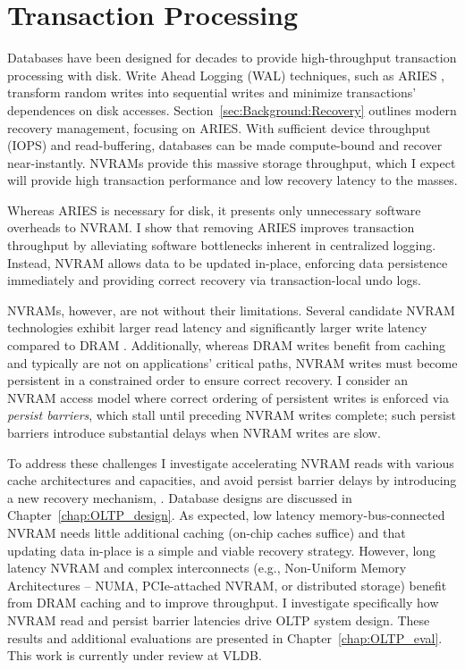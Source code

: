 \section{Transaction Processing}
\label{sec:Intro:OLTP}

Databases have been designed for decades to provide high-throughput transaction processing with disk.
Write Ahead Logging (WAL) techniques, such as ARIES \cite{MohanHaderle92}, transform random writes into sequential writes and minimize transactions' dependences on disk accesses.
Section~\ref{sec:Background:Recovery} outlines modern recovery management, focusing on ARIES.
With sufficient device throughput (IOPS) and read-buffering, databases can be made compute-bound and recover near-instantly.
NVRAMs provide this massive storage throughput, which I expect will provide high transaction performance and low recovery latency to the masses.

Whereas ARIES is necessary for disk, it presents only unnecessary software overheads to NVRAM.
I show that removing ARIES improves transaction throughput by alleviating software bottlenecks inherent in centralized logging.
Instead, NVRAM allows data to be updated in-place, enforcing data persistence immediately and providing correct recovery via transaction-local undo logs.

NVRAMs, however, are not without their limitations.
Se\-veral candidate NVRAM technologies exhibit larger read latency and significantly larger write latency compared to DRAM \cite{BurrKurdi08}.
Additionally, whereas DRAM writes benefit from caching and typically are not on applications' critical paths, NVRAM writes must become persistent in a constrained order to ensure correct recovery.
I consider an NVRAM access model where correct ordering of persistent writes is enforced via \emph{persist barriers}, which stall until preceding NVRAM writes complete; such persist barriers introduce substantial delays when NVRAM writes are slow.

To address these challenges I investigate accelerating NVRAM reads with various cache architectures and capacities, and avoid persist barrier delays by introducing a new recovery mechanism, \GroupCommit.
Database designs are discussed in Chapter~\ref{chap:OLTP_design}.
As expected, low latency memory-bus-connected NVRAM needs little additional caching (on-chip caches suffice) and that updating data in-place is a simple and viable recovery strategy.
However, long latency NVRAM and complex interconnects (e.g., Non-Uniform Memory Architectures -- NUMA, PCIe-attached NVRAM, or distributed storage) benefit from DRAM caching and \GroupCommit to improve throughput.
I investigate specifically how NVRAM read and persist barrier latencies drive OLTP system design.
These results and additional evaluations are presented in Chapter~\ref{chap:OLTP_eval}.
This work is currently under review at VLDB.

